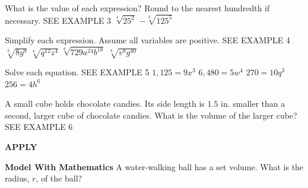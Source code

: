 \documentclass{article}
\newenvironment{practice}[2]{}{}
\newcommand{\placeholder}[2]{}
\begin{document}
What is the value of each expression? Round to the nearest hundredth if necessary. SEE EXAMPLE 3
\begin{practice}{33}{}
$\sqrt[4]{25^2}$
\end{practice}
\begin{practice}{34}{}
$-\sqrt[3]{125^5}$
\end{practice}

Simplify each expression. Assume all variables are positive. SEE EXAMPLE 4
\begin{practice}{35}{}
$\sqrt[3]{8y^9}$
\end{practice}
\begin{practice}{36}{}
$\sqrt[4]{q^{12}z^4}$
\end{practice}
\begin{practice}{37}{}
$\sqrt[6]{729a^{24}b^{18}}$
\end{practice}
\begin{practice}{38}{}
$\sqrt[8]{v^8g^{40}}$
\end{practice}

Solve each equation. SEE EXAMPLE 5
\begin{practice}{39}{}
$1,125 = 9x^3$
\end{practice}
\begin{practice}{40}{}
$6,480 = 5w^4$
\end{practice}
\begin{practice}{41}{}
$270 = 10q^3$
\end{practice}
\begin{practice}{42}{}
$256 = 4h^6$
\end{practice}

\begin{practice}{43}{}
A small cube holds chocolate candies. Its side length is $1.5 \text{ in.}$ smaller than a second, larger cube of chocolate candies. What is the volume of the larger cube? SEE EXAMPLE 6

\placeholder{illustration}{Two cubes of chocolate. Smaller cube labeled 'Volume is 85 in.$^3$' with 'DARK Chocolate' on it. Larger cube with 'Milk CHOCOLATE' on it.}
\end{practice}

\textbf{APPLY}

\begin{practice}{44}{}
\textbf{Model With Mathematics} A water-walking ball has a set volume. What is the radius, $r$, of the ball?

\placeholder{illustration}{Person inside a transparent inflatable ball walking on water. Label 'volume $\approx 4.19 \text{ m}^3$'.}
\end{practice}
\end{document}
